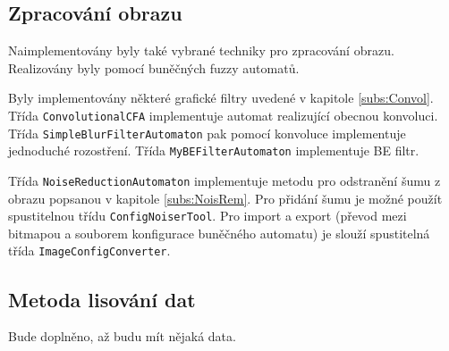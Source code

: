 \documentclass[a4paper,10pt]{article}
\begin{document}
\subsection{Zpracování obrazu}
Naimplementovány byly také vybrané techniky pro zpracování obrazu. Realizovány byly pomocí buněčných fuzzy automatů.

Byly implementovány některé grafické filtry uvedené v kapitole \ref{subs:Convol}. Třída \verb|ConvolutionalCFA| implementuje automat realizující obecnou konvoluci. Třída \verb|SimpleBlurFilterAutomaton| pak pomocí konvoluce implementuje jednoduché rozostření. Třída \verb|MyBEFilterAutomaton| implementuje BE filtr. 

Třída \verb|NoiseReductionAutomaton| implementuje metodu pro odstranění šumu z obrazu popsanou v kapitole \ref{subs:NoisRem}. Pro přidání šumu je možné použít spustitelnou třídu \verb|ConfigNoiserTool|. Pro import a export (převod mezi bitmapou a souborem konfigurace buněčného automatu) je slouží spustitelná třída \verb|ImageConfigConverter|.

\subsection{Metoda lisování dat}

Bude doplněno, až budu mít nějaká data. 

\end{document}
